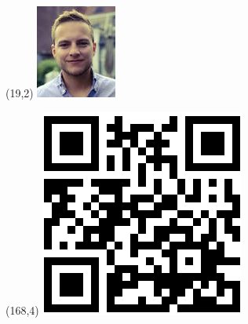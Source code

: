 \documentclass[]{my-resume}
\begin{document}
\begin{textblock}{1}(19,2)
\includegraphics[scale=0.60]{profil.jpg}
\end{textblock}

\begin{textblock}{1}(168,4)
\includegraphics[scale=0.25]{qrcode.png}
\end{textblock}

\lastupdated




\end{document}
